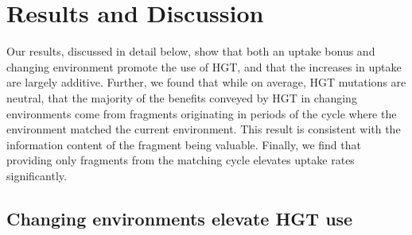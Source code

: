 \documentclass[PhD]{msu-thesis}
\begin{document}
\section{Results and Discussion}
Our results, discussed in detail below, show that both an uptake bonus and changing environment promote the use of HGT, and that the increases in uptake are largely additive. Further, we found that while on average, HGT mutations are neutral, that the majority of the benefits conveyed by HGT in changing environments come from fragments originating in periods of the cycle where the environment matched the current environment. This result is consistent with the information content of the fragment being valuable. Finally, we find that providing only fragments from the matching cycle elevates uptake rates significantly.

\subsection{Changing environments elevate HGT use}
\end{document}
